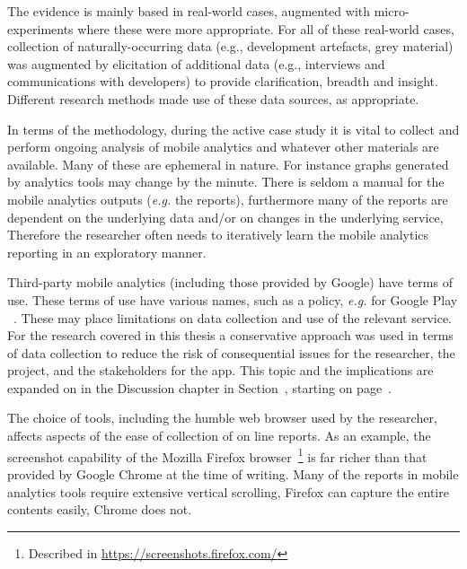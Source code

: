 The evidence is mainly based in real-world cases, augmented with micro-experiments where these were more appropriate. For all of these real-world cases, collection of naturally-occurring data (e.g., development artefacts, grey material) was augmented by elicitation of additional data (e.g., interviews and communications with developers) to provide clarification, breadth and insight.  Different research methods made use of these data sources, as appropriate.

In terms of the methodology, during the active case study it is vital to collect and perform ongoing analysis of mobile analytics and whatever other materials are available. Many of these are ephemeral in nature. For instance graphs generated by analytics tools may change by the minute. There is seldom a manual for the mobile analytics outputs (\textit{e.g.} the reports), furthermore many of the reports are dependent on the underlying data and/or on changes in the underlying service, Therefore the researcher often needs to iteratively learn the mobile analytics reporting in an exploratory manner.


Third-party mobile analytics (including those provided by Google) have terms of use. These terms of use have various names, such as a policy, \textit{e.g.} for Google Play ~\citet{google_play_developer_policy_center}. These may place limitations on data collection and use of the relevant service. For the research covered in this thesis a conservative approach was used in terms of data collection to reduce the risk of consequential issues for the researcher, the project, and the stakeholders for the app. This topic and the implications are expanded on in the Discussion chapter in Section~, starting on page~\pageref{discussion-considerations-on-the-method}.

The choice of tools, including the humble web browser used by the researcher, affects aspects of the ease of collection of on line reports. As an example, the screenshot capability of the Mozilla Firefox browser~\footnote{Described in \url{https://screenshots.firefox.com/}} is far richer than that provided by Google Chrome at the time of writing. Many of the reports in mobile analytics tools require extensive vertical scrolling, Firefox can capture the entire contents easily, Chrome does not. 


